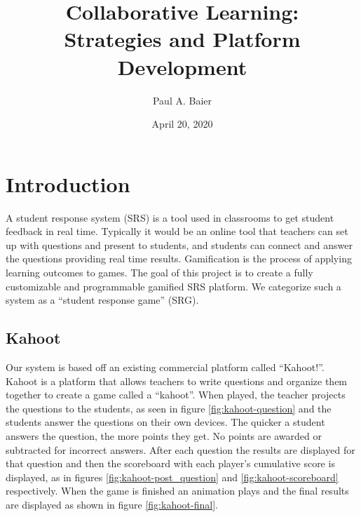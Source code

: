\documentclass{article}
\title{Collaborative Learning: \\
\normalsize Strategies and Platform Development
}
\author{Paul A. Baier}
\date{April 20, 2020}
\begin{document}
\maketitle

\section{Introduction}
    A student response system (SRS) is a tool used in classrooms to get student feedback in real time. Typically it would be an online tool that teachers can set up with questions and present to students, and students can connect and answer the questions providing real time results. Gamification is the process of applying learning outcomes to games. The goal of this project is to create a fully customizable and programmable gamified SRS platform. We categorize such a system as a ``student response game'' (SRG). 

    \subsection{Kahoot}
        Our system is based off an existing commercial platform called ``Kahoot!''. Kahoot is a platform that allows teachers to write questions and organize them together to create a game called a ``kahoot''. When played, the teacher projects the questions to the students, as seen in figure \ref{fig:kahoot-question} and the students answer the questions on their own devices. The quicker a student answers the question, the more points they get. No points are awarded or subtracted for incorrect answers. After each question the results are displayed for that question and then the scoreboard with each player's cumulative score is displayed, as in figures \ref{fig:kahoot-post_question} and \ref{fig:kahoot-scoreboard} respectively. When the game is finished an animation plays and the final results are displayed as shown in figure \ref{fig:kahoot-final}.
        
\end{document}
